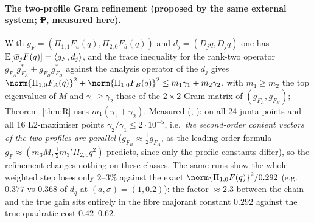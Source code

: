 \paragraph{The two-profile Gram refinement (proposed by the same external system; \st{P}, measured here).} With $g_F=(\Pi_{1,1}F_u(q),\Pi_{2,0}F_{\bar u}(q))$ and $d_j=(\overline{D_jq},\bar D_jq)$ one has
$\mathbb E[\bar w_jF(q)]=\langle g_F,d_j\rangle$, and the trace inequality for the rank-two operator $g_{F_A}g_{F_A}^*+g_{F_B}g_{F_B}^*$ against the analysis operator of the $d_j$ gives
$\norm{\Pi_{1,0}F_A(q)}^2+\norm{\Pi_{1,0}F_B(q)}^2\le m_1\gamma_1+m_2\gamma_2$, with $m_1\ge m_2$ the top eigenvalues of $M$ and $\gamma_1\ge\gamma_2$ those of the $2\times2$ Gram matrix of
$(g_{F_A},g_{F_B})$; Theorem~\ref{thm:R} uses $m_1(\gamma_1+\gamma_2)$. Measured (, ): on all 24 junta points and all 16 L2-maximiser points
$\gamma_2/\gamma_1\le2\cdot10^{-5}$, i.e.\ \emph{the second-order content vectors of the two profiles are parallel} ($g_{F_B}\approx\tfrac12g_{F_A}$, as the leading-order formula
$g_F\approx(m_3M,\tfrac12m_3'\Pi_{2,0}q^2)$ predicts, since only the profile constants differ), so the refinement changes nothing on these classes. The same runs show the whole weighted step
loses only $2$--$3\%$ against the exact $\norm{\Pi_{1,0}F(q)}^2/0.292$ (e.g.\ $0.377$ vs $0.368$ of $d_q$ at $(a,\sigma)=(1,0.2)$): the factor $\approx2.3$ between the chain and the true gain
sits entirely in the fibre majorant constant $0.292$ against the true quadratic cost $0.42$--$0.62$.

